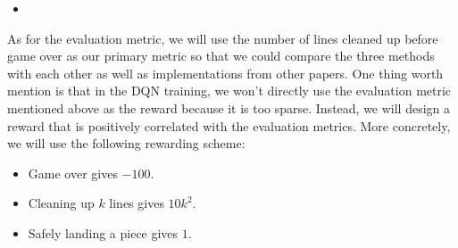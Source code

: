 \documentclass[letterpaper]{article} %
\begin{document}
\begin{itemize}
\begin{itemize}
    \item {}
  
\end{itemize}
{As for the evaluation metric, we will use the number of lines cleaned up before game over as our primary metric so that we could compare the three methods with each other as well as implementations from other papers. One thing worth mention is that in the DQN training, we won't directly use the evaluation metric mentioned above as the reward because it is too sparse. Instead, we will design a reward that is positively correlated with the evaluation metrics. More concretely, we will use the following rewarding scheme:}
\begin{itemize}
  \item Game over gives $-100$.
  \item Cleaning up $k$ lines gives $10k^{2}$.
  \item Safely landing a piece gives $1$.
\end{itemize}



\end{itemize}
\end{document}
